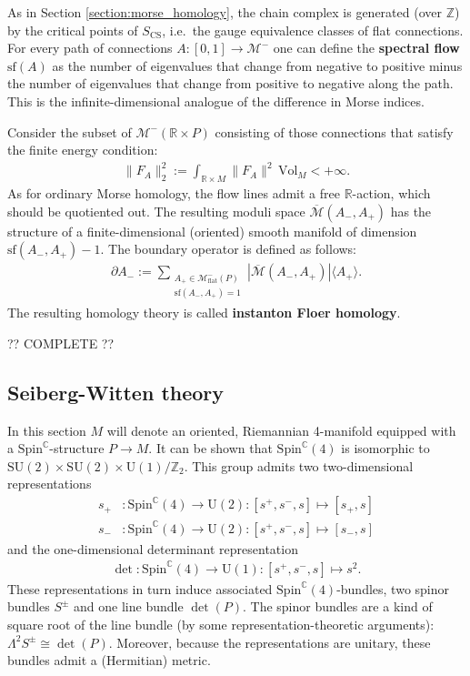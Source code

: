     As in Section \ref{section:morse_homology}, the chain complex is generated (over $\mathbb{Z}$) by the critical points of $S_\mathrm{CS}$, i.e.~the gauge equivalence classes of flat connections. For every path of connections $A:[0,1]\rightarrow\mathcal{M}^-$ one can define the \textbf{spectral flow} $\mathrm{sf}(A)$ as the number of eigenvalues that change from negative to positive minus the number of eigenvalues that change from positive to negative along the path. This is the infinite-dimensional analogue of the difference in Morse indices.

    Consider the subset of $\mathcal{M}^-(\mathbb{R}\times P)$ consisting of those connections that satisfy the finite energy condition:
    \begin{gather}
        \|F_A\|^2_2 := \int_{\mathbb{R}\times M}\|F_A\|^2\,\mathrm{Vol}_M<+\infty.
    \end{gather}
    As for ordinary Morse homology, the flow lines admit a free $\mathbb{R}$-action, which should be quotiented out. The resulting moduli space $\overline{\mathcal{M}}(A_-,A_+)$ has the structure of a finite-dimensional (oriented) smooth manifold of dimension $\mathrm{sf}(A_-,A_+)-1$. The boundary operator is defined as follows:
    \begin{gather}
        \partial A_- := \sum_{\substack{A_+\in\mathcal{M}^-_\mathrm{flat}(P)\\\mathrm{sf}(A_-,A_+)=1}}\left|\overline{\mathcal{M}}(A_-,A_+)\right|\langle A_+ \rangle.
    \end{gather}
    The resulting homology theory is called \textbf{instanton Floer homology}.

    ?? COMPLETE ??

\subsection{Seiberg-Witten theory}

    In this section $M$ will denote an oriented, Riemannian 4-manifold equipped with a $\mathrm{Spin}^\mathbb{C}$-structure $P\rightarrow M$. It can be shown that $\mathrm{Spin}^\mathbb{C}(4)$ is isomorphic to $\mathrm{SU}(2)\times\mathrm{SU}(2)\times\mathrm{U}(1)/\mathbb{Z}_2$. This group admits two two-dimensional representations
    \begin{align}
        s_+&:\mathrm{Spin}^\mathbb{C}(4)\rightarrow\mathrm{U}(2):[s^+,s^-,s]\mapsto[s_+,s]\\
        s_-&:\mathrm{Spin}^\mathbb{C}(4)\rightarrow\mathrm{U}(2):[s^+,s^-,s]\mapsto[s_-,s]
    \end{align}
    and the one-dimensional determinant representation
    \begin{gather}
        \det:\mathrm{Spin}^\mathbb{C}(4)\rightarrow\mathrm{U}(1):[s^+,s^-,s]\mapsto s^2.
    \end{gather}
    These representations in turn induce associated $\mathrm{Spin}^\mathbb{C}(4)$-bundles, two spinor bundles $S^\pm$ and one line bundle $\det(P)$. The spinor bundles are a kind of square root of the line bundle (by some representation-theoretic arguments): $\Lambda^2S^\pm\cong\det(P)$. Moreover, because the representations are unitary, these bundles admit a (Hermitian) metric.

